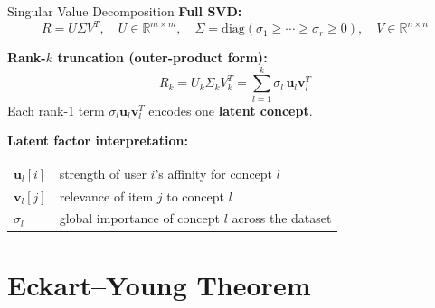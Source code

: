 \documentclass[10pt,t]{beamer}
\newcommand{\R}{\mathbb{R}}
\begin{document}
\begin{frame}{Singular Value Decomposition}
  \textbf{Full SVD:}
  \[
    R = U\Sigma V^T,\quad
    U\in\R^{m\times m},\quad \Sigma = \mathrm{diag}(\sigma_1\geq\cdots\geq\sigma_r\geq 0),\quad
    V\in\R^{n\times n}
  \]

  \vspace{0.3em}
  \textbf{Rank-$k$ truncation (outer-product form):}
  \[
    R_k = U_k\Sigma_k V_k^T
        = \sum_{l=1}^{k} \sigma_l\,\mathbf{u}_l\mathbf{v}_l^T
  \]
  Each rank-1 term $\sigma_l\mathbf{u}_l\mathbf{v}_l^T$ encodes one \textbf{latent concept}.

  \vspace{0.4em}
  \textbf{Latent factor interpretation:}
  \begin{center}
  \small
  \begin{tabular}{ll}
    $\mathbf{u}_l[i]$ & strength of user $i$'s affinity for concept $l$ \\
    $\mathbf{v}_l[j]$ & relevance of item $j$ to concept $l$ \\
    $\sigma_l$        & global importance of concept $l$ across the dataset
  \end{tabular}
  \end{center}
\end{frame}

\section{Eckart--Young Theorem}
\end{document}
